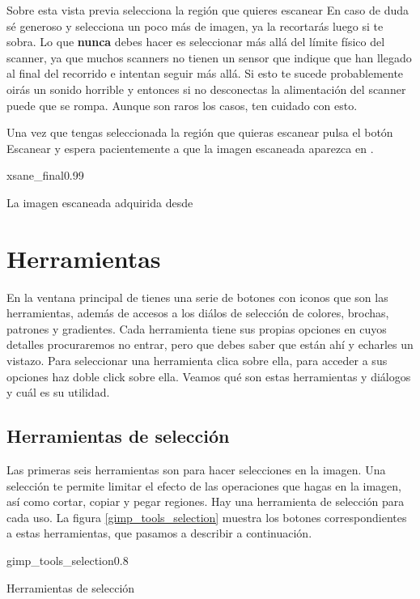 Sobre esta vista  previa selecciona la región que  quieres escanear En
caso de  duda sé generoso  y selecciona un poco  más de imagen,  ya la
recortarás  luego si  te  sobra. Lo  que {\bf  nunca}  debes hacer  es
seleccionar  más allá  del límite  físico del  scanner, ya  que muchos
scanners no tienen un sensor que  indique que han llegado al final del
recorrido e intentan seguir más  allá. Si esto te sucede probablemente
oirás un sonido horrible y  entonces si no desconectas la alimentación
del  scanner puede  que  se rompa.  Aunque son  raros  los casos,  ten
cuidado con esto.

Una vez que  tengas seleccionada la región que  quieras escanear pulsa
el  botón  {\sf Escanear}  y  espera  pacientemente  a que  la  imagen
escaneada aparezca en \gimp.

\begin{figura}{xsane_final}{0.99}
\caption{La imagen escaneada adquirida desde \gimp}
\end{figura}

\section{Herramientas}

En  la ventana  principal de  \gimp tienes  una serie  de botones  con
iconos que  son las herramientas,  además de  accesos a los  diálos de
selección de colores, brochas, patrones y gradientes. Cada herramienta
tiene sus propias  opciones en cuyos detalles  procuraremos no entrar,
pero  que debes  saber  que  están ahí  y  echarles  un vistazo.  Para
seleccionar  una herramienta  clica  sobre ella,  para  acceder a  sus
opciones haz doble click sobre ella. Veamos qué son estas herramientas
y diálogos y cuál es su utilidad.

\subsection{Herramientas de selección}

Las  primeras   seis  herramientas  son  para   hacer  selecciones  en
la  imagen.  Una  selección  te  permite  limitar  el  efecto  de  las
operaciones que  hagas en la imagen,  así como cortar, copiar  y pegar
regiones. Hay  una herramienta de  selección para cada uso.  La figura
\ref{gimp_tools_selection}  muestra  los  botones  correspondientes  a
estas herramientas, que pasamos a describir a continuación.

\begin{figura}{gimp_tools_selection}{0.8}
\caption{Herramientas de selección}
\end{figura}


